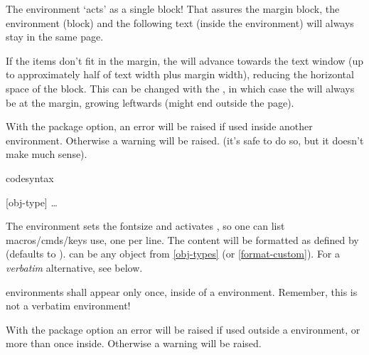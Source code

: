 \documentclass{article}
\begin{document}
\begin{tsremark}
  The  environment `acts' as a single block! That assures the margin block, the  environment (block) and the following text (inside the  environment) will always stay in the same page.
\end{tsremark}
\begin{tsremark}
  If the items don't fit in the margin, the  will advance towards the text window (up to approximately half of text width plus margin width), reducing the horizontal space of the  block. This can be changed with the , in which case the   will always be at the margin, growing leftwards (might end outside the page).
\end{tsremark}
\begin{tsremark}
With the  package option,
an error will be raised if used inside another  environment. Otherwise a warning will be raised. (it's safe to do so, but it doesn't make much sense).
\end{tsremark}

\begin{codedescribe}[env,update=2025/09/25,update=2025/11/25]{codesyntax}
\begin{codesyntax}
\tsmacro{\begin{codesyntax}}[obj-type]{}
\ldots
\tsmacro{\end{codesyntax}}{}
\end{codesyntax}
The  environment sets the fontsize and activates \tsmacro{\obeylines,\obeyspaces}{}, so one can list macros/cmds/keys use, one per line. The content will be formatted as defined by  (defaults to ).  can be any object from \ref{obj-types} (or \ref{format-custom}). For a \emph{verbatim} alternative, see  below.
\end{codedescribe}

\begin{tsremark}
 environments shall appear only once, inside of a  environment. 
 Remember,  this is not a verbatim environment!
\end{tsremark}
\begin{tsremark}
With the  package option
an error will be raised if used outside a  environment, or more than once inside. Otherwise a warning will be raised.
\end{tsremark}
\end{document}

